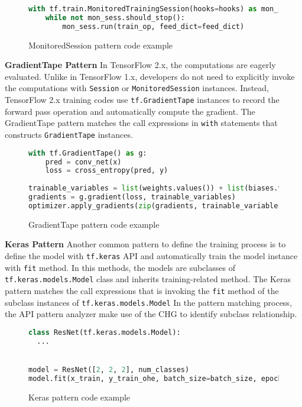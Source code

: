 \begin{figure}
  \begin{lstlisting}[language=Python]
with tf.train.MonitoredTrainingSession(hooks=hooks) as mon_sess:
    while not mon_sess.should_stop():
        mon_sess.run(train_op, feed_dict=feed_dict)
  \end{lstlisting}
  \caption{MonitoredSession pattern code example}
\end{figure}

\textbf{GradientTape Pattern}
In TensorFlow 2.x, the computations are eagerly evaluated.
Unlike in TensorFlow 1.x, developers do not need to explicitly invoke the computations
with {\tt Session} or {\tt MonitoredSession} instances.
Instead, TensorFlow 2.x training codes use {\tt tf.GradientTape} instances
to record the forward pass operation and automatically compute the gradient.
The GradientTape pattern matches the call expressions in {\tt with} statements
that constructs {\tt GradientTape} instances.

\begin{figure}
  \begin{lstlisting}[language=Python]
with tf.GradientTape() as g:
    pred = conv_net(x)
    loss = cross_entropy(pred, y)
    
trainable_variables = list(weights.values()) + list(biases.values())
gradients = g.gradient(loss, trainable_variables)
optimizer.apply_gradients(zip(gradients, trainable_variables))
  \end{lstlisting}
  \caption{GradientTape pattern code example}
\end{figure}

\textbf{Keras Pattern}
Another common pattern to define the training process is to define
the model with {\tt tf.keras} API and automatically train the model
instance with {\tt fit} method.
In this methods, the models are subclasses of {\tt tf.keras.models.Model} class
and inherits training-related method.
The Keras pattern matches the call expressions that is invoking the {\tt fit}
method of the subclass instances of {\tt tf.keras.models.Model}
In the pattern matching process, the API pattern analyzer
make use of the CHG to identify subclass relationship. 

\begin{figure}
  \begin{lstlisting}[language=Python]
class ResNet(tf.keras.models.Model):
  ...


model = ResNet([2, 2, 2], num_classes)
model.fit(x_train, y_train_ohe, batch_size=batch_size, epochs=epochs,
  \end{lstlisting}
  \caption{Keras pattern code example}
\end{figure}


